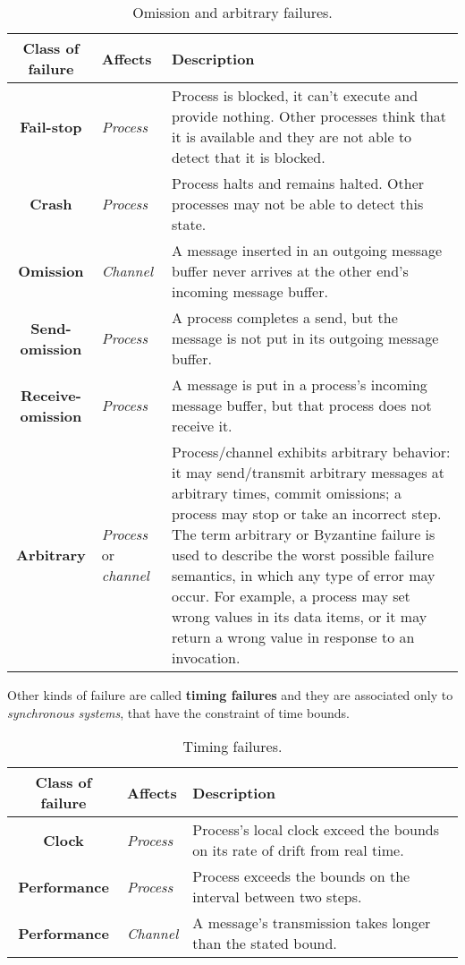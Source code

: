 \begin{table}[H]
    \centering
    \begin{tabular}{| c | p{1.7cm} | p{9.5cm} |}
        \hline
        \textbf{Class of failure} & \textbf{Affects} & \textbf{Description} \\ \hline
        \textbf{Fail-stop} & \textit{Process} & Process is blocked, it can't execute and provide nothing. Other processes think that it is available and they are not able to detect that it is blocked. \\
        \hline
        \textbf{Crash} & \textit{Process} & Process halts and remains halted. Other processes may not be able to detect this state. \\
        \hline
        \textbf{Omission} & \textit{Channel} & A message inserted in an outgoing message buffer never arrives at the other end's incoming message buffer.\\
        \hline
        \textbf{Send-omission} & \textit{Process} & A process completes a send, but the message is not put in its outgoing message buffer. \\
        \hline
        \textbf{Receive-omission} & \textit{Process} & A message is put in a process's incoming message buffer, but that process does not receive it.\\
        \hline
        \textbf{Arbitrary} & \textit{Process} or \textit{channel} & Process/channel exhibits arbitrary behavior: it may send/transmit arbitrary messages at arbitrary times, commit omissions; a process may stop or take an incorrect step. The term arbitrary or Byzantine failure is used to describe the worst possible failure semantics, in which any type of error may occur. For example, a process may set wrong values in its data items, or it may return a wrong value in response to an invocation.\\
        \hline
    \end{tabular}
    \caption{Omission and arbitrary failures.}
\end{table}
\par
Other kinds of failure are called \textbf{timing failures} and they are associated only to \textit{synchronous systems}, that have the constraint of time bounds.
\begin{table}[H]
    \centering
    \begin{tabular}{| c | p{1.7cm} | p{9.5cm} |}
        \hline
        \textbf{Class of failure} & \textbf{Affects} & \textbf{Description} \\ \hline
        \textbf{Clock} & \textit{Process} & Process's local clock exceed the bounds on its rate of drift from real time. \\
        \hline
        \textbf{Performance} & \textit{Process} & Process exceeds the bounds on the interval between two steps.\\
        \hline
        \textbf{Performance} & \textit{Channel} & A message's transmission takes longer than the stated bound.\\
        \hline
    \end{tabular}
    \caption{Timing failures.}
\end{table}
